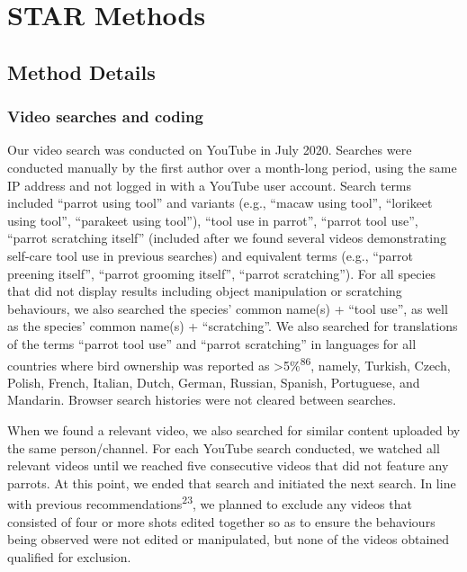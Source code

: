 \documentclass[
  man, donotrepeattitle,floatsintext]{apa6}
\begin{document}
\newpage

\hypertarget{star-methods}{%
\section{STAR Methods}\label{star-methods}}

\hypertarget{method-details}{%
\subsection{Method Details}\label{method-details}}

\hypertarget{video-searches-and-coding}{%
\subsubsection{Video searches and coding}\label{video-searches-and-coding}}

Our video search was conducted on YouTube in July 2020. Searches were conducted
manually by the first author over a month-long period, using the same IP address
and not logged in with a YouTube user account. Search terms included
``parrot using tool'' and variants (e.g., ``macaw using tool'', ``lorikeet using
tool'', ``parakeet using tool''), ``tool use in parrot'', ``parrot tool use'', ``parrot
scratching itself'' (included after we found several videos demonstrating
self-care tool use in previous searches) and equivalent terms (e.g., ``parrot
preening itself'', ``parrot grooming itself'', ``parrot scratching''). For all
species that did not display results including object manipulation or scratching
behaviours, we also searched the species' common name(s) + ``tool use'', as well
as the species' common name(s) + ``scratching''. We also searched for translations
of the terms ``parrot tool use'' and ``parrot scratching'' in languages for all
countries where bird ownership was reported as \textgreater5\%\textsuperscript{86}, namely,
Turkish, Czech, Polish, French, Italian, Dutch, German, Russian, Spanish,
Portuguese, and Mandarin. Browser search histories were not cleared between
searches.

When we found a relevant video, we also searched for similar content uploaded by
the same person/channel. For each YouTube search conducted, we watched all
relevant videos until we reached five consecutive videos that did not feature
any parrots. At this point, we ended that search and initiated the next search.
In line with previous recommendations\textsuperscript{23}, we planned to exclude any
videos that consisted of four or more shots edited together so as to ensure the
behaviours being observed were not edited or manipulated, but none of the videos
obtained qualified for exclusion.
\end{document}
